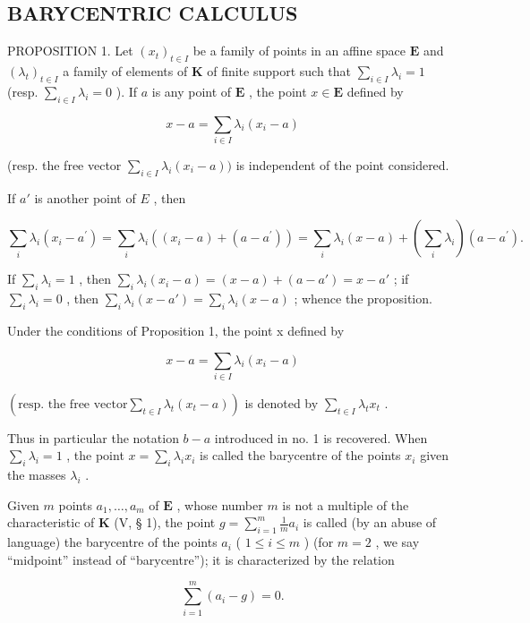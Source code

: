 \subsection{BARYCENTRIC CALCULUS}

PROPOSITION 1. Let \((x_{t})_{t\in I}\) be a family of points in an affine space \(\mathbf{E}\) and \((\lambda_t)_{t\in I}\) a family of elements of \(\mathbf{K}\) of finite support such that \(\sum_{i\in I}\lambda_i = 1\) (resp. \(\sum_{i\in I}\lambda_i = 0\) ). If \(a\) is any point of \(\mathbf{E}\) , the point \(x\in \mathbf{E}\) defined by

\[
x - a = \sum_ {i \in I} \lambda_ {i} (x _ {i} - a)
\]

(resp. the free vector \(\sum_{i\in I}\lambda_i(x_i - a))\) is independent of the point considered.

If \(a'\) is another point of \(E\) , then

\[
\sum_ {i} \lambda_ {i} (x _ {i} - a ^ {\prime}) = \sum_ {i} \lambda_ {i} ((x _ {i} - a) + (a - a ^ {\prime})) = \sum_ {i} \lambda_ {i} (x - a) + \left(\sum_ {i} \lambda_ {i}\right) (a - a ^ {\prime}).
\]

If \(\sum_{i}\lambda_{i} = 1\) , then \(\sum_{i}\lambda_{i}(x_{i} - a) = (x - a) + (a - a') = x - a'\) ; if \(\sum_{i}\lambda_{i} = 0\) , then \(\sum_{i}\lambda_{i}(x - a') = \sum_{i}\lambda_{i}(x - a)\) ; whence the proposition.

Under the conditions of Proposition 1, the point x defined by

\[
x - a = \sum_ {i \in I} \lambda_ {i} (x _ {i} - a)
\]

\(\left(\text{resp. the free vector} \sum_{t \in I} \lambda_t(x_t - a)\right)\) is denoted by \(\sum_{t \in I} \lambda_t x_t\) .

Thus in particular the notation \(b - a\) introduced in no. 1 is recovered. When \(\sum_{i} \lambda_{i} = 1\) , the point \(x = \sum_{i} \lambda_{i} x_{i}\) is called the barycentre of the points \(x_{i}\) given the masses \(\lambda_{i}\) .

Given \(m\) points \(a_1, \ldots, a_m\) of \(\mathbf{E}\) , whose number \(m\) is not a multiple of the characteristic of \(\mathbf{K}\) (V, § 1), the point \(g = \sum_{i=1}^{m} \frac{1}{m} a_i\) is called (by an abuse of language) the barycentre of the points \(a_i\) ( \(1 \leqslant i \leqslant m\) ) (for \(m = 2\) , we say ``midpoint'' instead of ``barycentre''); it is characterized by the relation

\[
\sum_ {i = 1} ^ {m} \left(a _ {i} - g\right) = 0.
\]

